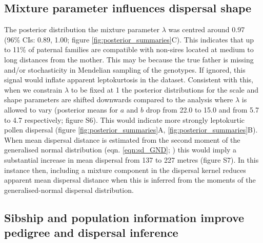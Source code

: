 \documentclass[10pt, a4paper, twocolumn]{article} %
\begin{document}
\subsection{Mixture parameter influences dispersal shape}

The posterior distribution the mixture parameter $\lambda$ was centred around 0.97 (96\% CIs: 0.89, 1.00; figure \ref{fig:posterior_summaries}C).
This indicates that up to 11\% of paternal families are compatible with non-sires located at medium to long distances from the mother.
This may be because the true father is missing and/or stochasticity in Mendelian sampling of the genotypes.
If ignored, this signal would inflate apparent leptokurtosis in the dataset.
Consistent with this, when we constrain $\lambda$ to be fixed at 1 the posterior distributions for the scale and shape parameters are shifted downwards compared to the analysis where $\lambda$ is allowed to vary (posterior means for $a$ and $b$ drop from 22.0 to 15.0 and from 5.7 to 4.7 respectively; figure S6).
This would indicate more strongly leptokurtic pollen dispersal (figure \ref{fig:posterior_summaries}A, \ref{fig:posterior_summaries}B).
When mean dispersal distance is estimated from the second moment of the generalised normal distribution (eqn. \ref{eqn:sd_GND}; \cite{clark1998trees}) this would imply a substantial increase in mean dispersal from 137 to 227 metres (figure S7).
In this instance then, including a mixture component in the dispersal kernel reduces apparent mean dispersal distance when this is inferred from the moments of the generalised-normal dispersal distribution.

\subsection{Sibship and population information improve pedigree and dispersal inference}
\end{document}
